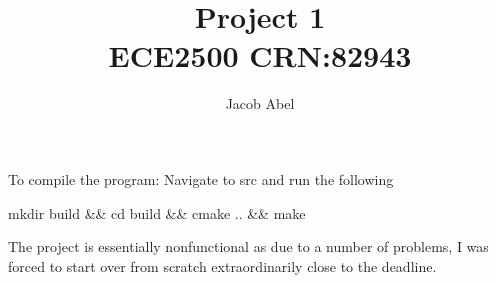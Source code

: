 \documentclass[12pt,letterpaper,titlepage]{article}
\author{Jacob Abel}
\title{	Project 1
	\\\large ECE2500 CRN:82943
}
\begin{document}
\maketitle
\begin{raggedright}

To compile the program: Navigate to src and run the following 

mkdir build \&\& cd build \&\& cmake .. \&\& make

The project is essentially nonfunctional as due to a number of problems, I was forced to start over from scratch extraordinarily close to the deadline.

\end{raggedright}
\end{document}
